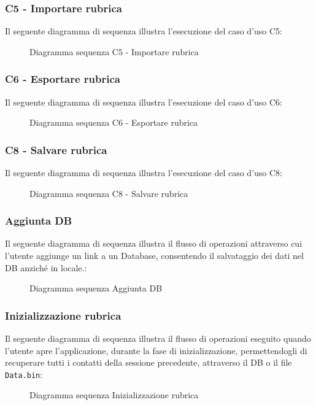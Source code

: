 \newpage
\subsubsection{C5 - Importare rubrica}
Il seguente diagramma di sequenza illustra l'esecuzione del caso d'uso C5:

\begin{figure}[h]
	\caption{Diagramma sequenza C5 - Importare rubrica}
	\label{fig:Diagramma sequenza C5 - Importare rubrica}
\end{figure}

\newpage
\subsubsection{C6 - Esportare rubrica}
Il seguente diagramma di sequenza illustra l'esecuzione del caso d'uso C6:

\begin{figure}[h]
	\caption{Diagramma sequenza C6 - Esportare rubrica}
	\label{fig:Diagramma sequenza C6 - Esportare rubrica}
\end{figure}

\newpage
\subsubsection{C8 - Salvare rubrica}
Il seguente diagramma di sequenza illustra l'esecuzione del caso d'uso C8:

\begin{figure}[h]
	\caption{Diagramma sequenza C8 - Salvare rubrica}
	\label{fig:Diagramma sequenza C8 - Salvare rubrica}
\end{figure}

\newpage
\subsubsection{Aggiunta DB}
Il seguente diagramma di sequenza illustra il flusso di operazioni attraverso cui l'utente aggiunge un link a un Database, consentendo il salvataggio dei dati nel DB anziché in locale.:

\begin{figure}[h]
	\caption{Diagramma sequenza Aggiunta DB}
	\label{fig:Diagramma sequenza Aggiunta DB}
\end{figure}

\newpage
\subsubsection{Inizializzazione rubrica}
Il seguente diagramma di sequenza illustra il flusso di operazioni eseguito quando l'utente apre l'applicazione, durante la fase di inizializzazione, permettendogli di recuperare tutti i contatti della sessione precedente, attraverso il DB o il file \texttt{Data.bin}:

\begin{figure}[h]
	\caption{Diagramma sequenza Inizializzazione rubrica}
	\label{fig:Diagramma sequenza Inizializzazione rubrica}
\end{figure}


